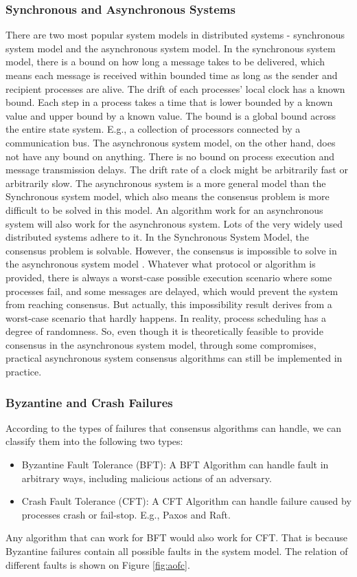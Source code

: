 \documentclass[12pt, a4paper]{article}
\begin{document}
\subsubsection{Synchronous and Asynchronous Systems}
There are two most popular system models in distributed systems - synchronous system model and the asynchronous system model. In the synchronous system model, there is a bound on how long a message takes to be delivered, which means each message is received within bounded time as long as the sender and recipient processes are alive. The drift of each processes' local clock has a known bound. Each step in a process takes a time that is lower bounded by a known value and upper bound by a known value. The bound is a global bound across the entire state system. E.g., a collection of processors connected by a communication bus. The asynchronous system model, on the other hand, does not have any bound on anything. There is no bound on process execution and message transmission delays. The drift rate of a clock might be arbitrarily fast or arbitrarily slow. The asynchronous system is a more general model than the Synchronous system model, which also means the consensus problem is more difficult to be solved in this model. An algorithm work for an asynchronous system will also work for the asynchronous system. Lots of the very widely used distributed systems adhere to it. In the Synchronous System Model, the consensus problem is solvable. However, the consensus is impossible to solve in the asynchronous system model \cite{fischer1985impossibility}. Whatever what protocol or algorithm is provided, there is always a worst-case possible execution scenario where some processes fail, and some messages are delayed, which would prevent the system from reaching consensus. But actually, this impossibility result derives from a worst-case scenario that hardly happens. In reality, process scheduling has a degree of randomness.\cite{aguilera2010stumbling} So, even though it is theoretically feasible to provide consensus in the asynchronous system model, through some compromises, practical asynchronous system consensus algorithms can still be implemented in practice.

\subsubsection{Byzantine and Crash Failures}
According to the types of failures that consensus algorithms can handle, we can classify them into the following two types:
\begin{itemize}
	\item Byzantine Fault Tolerance (BFT): A BFT Algorithm can handle fault in arbitrary ways, including malicious actions of an adversary.
	\item Crash Fault Tolerance (CFT): A CFT Algorithm can handle failure caused by processes crash or fail-stop. E.g., Paxos and Raft.
\end{itemize}
Any algorithm that can work for BFT would also work for CFT. That is because Byzantine failures contain all possible faults in the system model. The relation of different faults \cite{barborak1993consensus} is shown on Figure \ref{fig:aofc}.
\end{document}
